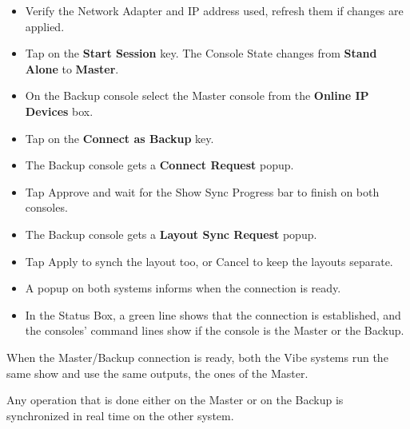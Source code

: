 \documentclass[
]{article}
\providecommand{\tightlist}{%
  \setlength{\itemsep}{0pt}\setlength{\parskip}{0pt}}
\begin{document}
\begin{itemize}
\item
  Verify the Network Adapter and IP address used, refresh them if changes are applied.
\item
  Tap on the \textbf{Start Session} key. The Console State changes from \textbf{Stand Alone} to \textbf{Master}.
\end{itemize}

\begin{itemize}
\item
  On the Backup console select the Master console from the \textbf{Online IP Devices} box.
\item
  Tap on the \textbf{Connect as Backup} key.
\end{itemize}

\begin{itemize}
\tightlist
\item
  The Backup console gets a \textbf{Connect Request} popup.
\end{itemize}

\begin{itemize}
\tightlist
\item
  Tap Approve and wait for the Show Sync Progress bar to finish on both consoles.
\end{itemize}

\begin{itemize}
\tightlist
\item
  The Backup console gets a \textbf{Layout Sync Request} popup.
\end{itemize}

\begin{itemize}
\item
  Tap Apply to synch the layout too, or Cancel to keep the layouts separate.
\item
  A popup on both systems informs when the connection is ready.
\end{itemize}

\begin{itemize}
\tightlist
\item
  In the Status Box, a green line shows that the connection is established, and the consoles' command lines show if the console is the Master or the Backup.
\end{itemize}

When the Master/Backup connection is ready, both the Vibe systems run the same show and use the same outputs, the ones of the Master.

Any operation that is done either on the Master or on the Backup is synchronized in real time on the other system.
\end{document}
